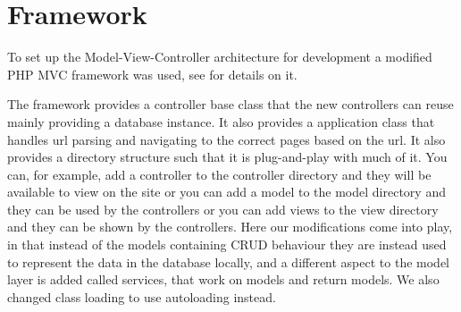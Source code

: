 \section{Framework}
To set up the Model-View-Controller architecture for development a modified PHP MVC framework was used, see \citep{misc:mvc-framework} for details on it.

The framework provides a controller base class that the new controllers can reuse mainly providing a database instance.
It also provides a application class that handles url parsing and navigating to the correct pages based on the url.
It also provides a directory structure such that it is plug-and-play with much of it. 
You can, for example, add a controller to the controller directory and they will be available to view on the site or you can add a model to the model directory and they can be used by the controllers or you can add views to the view directory and they can be shown by the controllers.
Here our modifications come into play, in that instead of the models containing CRUD behaviour they are instead used to represent the data in the database locally, and a different aspect to the model layer is added called services, that work on models and return models.
We also changed class loading to use autoloading instead.

